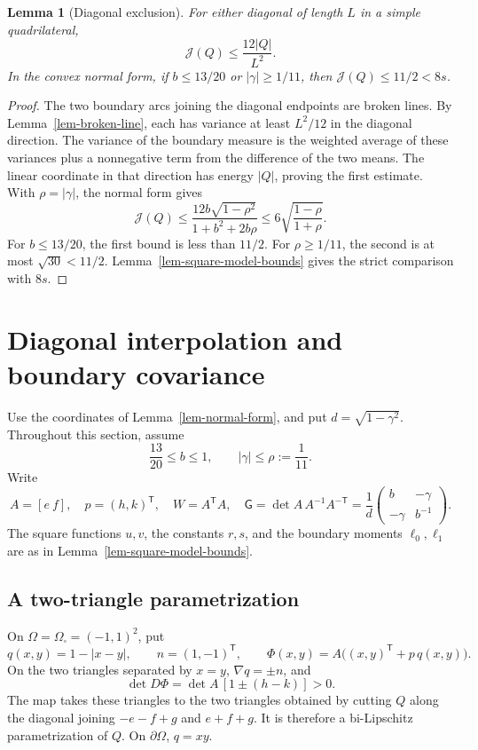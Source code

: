 \documentclass[11pt]{amsart}
\newtheorem{lemma}[theorem]{Lemma}
\theoremstyle{remark}\newtheorem{remark}[theorem]{Remark}
\numberwithin{equation}{section}
\begin{document}
\begin{lemma}[Diagonal exclusion]\label{lem-diagonal-exclusion}
For either diagonal of length $L$ in a simple quadrilateral,
\[
\mathcal J(Q)\le\frac{12|Q|}{L^2}.
\]
In the convex normal form, if $b\le13/20$ or
$|\gamma|\ge1/11$, then $\mathcal J(Q)\le11/2<8s$.
\end{lemma}
\begin{proof}
The two boundary arcs joining the diagonal endpoints are broken lines.
By Lemma~\ref{lem-broken-line}, each has variance at least $L^2/12$
in the diagonal direction. The variance of the boundary measure is the weighted average of these
variances plus a nonnegative term from the difference of the two means.
The linear coordinate in that direction has energy $|Q|$, proving the
first estimate. With $\rho=|\gamma|$, the normal form gives
\[
\mathcal J(Q)\le
\frac{12b\sqrt{1-\rho^2}}{1+b^2+2b\rho}
\le6\sqrt{\frac{1-\rho}{1+\rho}}.
\]
For $b\le13/20$, the first bound is less than $11/2$.
For $\rho\ge1/11$, the second is at most $\sqrt{30}<11/2$.
Lemma~\ref{lem-square-model-bounds} gives the strict comparison with $8s$.
\end{proof}


\section{Diagonal interpolation and boundary covariance}
\label{sec-global-interpolation}

Use the coordinates of Lemma~\ref{lem-normal-form}, and put
\(d=\sqrt{1-\gamma^2}\). Throughout this section, assume
\begin{equation}
\label{eq-new-compact-affine}
\frac{13}{20}\le b\le1,\qquad
|\gamma|\le\rho:=\frac1{11}.
\end{equation}
Write
\[
A=[e\ f],\quad p=(h,k)^{\mathsf T},\quad
W=A^{\mathsf T}A,\quad
\mathsf G=\det A\,A^{-1}A^{-\mathsf T}
=\frac1d\begin{pmatrix}b&-\gamma\\-\gamma&b^{-1}\end{pmatrix}.
\]
The square functions \(u,v\), the constants \(r,s\), and the boundary
moments \(\ell_0,\ell_1\) are as in
Lemma~\ref{lem-square-model-bounds}.

\subsection{A two-triangle parametrization}

On \(\Omega=\Omega_\square=(-1,1)^2\), put
\[
q(x,y)=1-|x-y|,\qquad n=(1,-1)^{\mathsf T},\qquad
\Phi(x,y)=A\bigl((x,y)^{\mathsf T}+p\,q(x,y)\bigr).
\]
On the two triangles separated by \(x=y\),
\(\nabla q=\pm n\), and
\[
\det D\Phi=\det A\,[1\pm(h-k)]>0.
\]
The map takes these triangles to the two triangles obtained by
cutting \(Q\) along the diagonal joining \(-e-f+g\) and \(e+f+g\).
It is therefore a bi-Lipschitz parametrization of \(Q\).
On \(\partial\Omega\), \(q=xy\).
\end{document}
